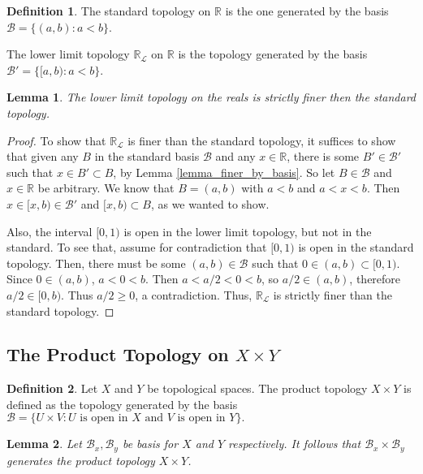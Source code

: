 \documentclass{article}
\newtheorem{lemma}{Lemma}[subsection]
\theoremstyle{definition}
\newtheorem{definition}{Definition}[subsection]
\theoremstyle{remark}
\newcommand{\R}{\mathbb{R}}
\newcommand{\set}[1]{\{#1\}}
\newcommand{\prt}[1]{\mathcal{#1}}
\begin{document}
\begin{definition}
    The standard topology on $\R$ is the one generated by the basis $\prt{B} = \set{(a, b) : a < b}$.

    The lower limit topology $\R_{\prt{L}}$ on $\R$ is the topology generated by the basis $\prt{B'} = \set{[a, b) : a < b}$.
\end{definition}

\begin{lemma}
    The lower limit topology on the reals is strictly finer then the standard topology.
\end{lemma}

\begin{proof}
    To show that $\R_{\prt{L}}$ is finer than the standard topology, it suffices to show that given any $B$ in the standard basis $\prt{B}$ and any $x \in \R$, there is some $B' \in \prt{B'}$ such that $x \in B' \subset B$, by Lemma \ref{lemma_finer_by_basis}. So let $B \in \prt{B}$ and $x \in \R$ be arbitrary. We know that $B = (a, b)$ with $a < b$ and $a < x < b$. Then $x \in [x, b) \in \prt{B'}$ and $[x, b) \subset B$, as we wanted to show.
    
    Also, the interval $[0, 1)$ is open in the lower limit topology, but not in the standard. To see that, assume for contradiction that $[0, 1)$ is open in the standard topology. Then, there must be some $(a, b) \in \prt{B}$ such that $0 \in (a, b) \subset [0, 1)$. Since $0 \in (a, b)$, $a < 0 < b$. Then $a < a/2 < 0 < b$, so $a/2 \in (a, b)$, therefore $a/2 \in [0, b)$. Thus $a/2 \geq 0$, a contradiction. Thus, $\R_{\prt{L}}$ is strictly finer than the standard topology.
\end{proof}

\subsection{The Product Topology on \texorpdfstring{$X \times Y$}{X x Y}}

\begin{definition}
    Let $X$ and $Y$ be topological spaces. The product topology $X \times Y$ is defined as the topology generated by the basis $\prt{B} = \set{U \times V : \text{$U$ is open in $X$ and $V$ is open in $Y$}}.$
\end{definition}

\begin{lemma}
    Let $\prt{B}_x, \prt{B}_y$ be basis for $X$ and $Y$ respectively. It follows that $\prt{B}_x \times \prt{B}_y$ generates the product topology $X \times Y$.
\end{lemma}
\end{document}

